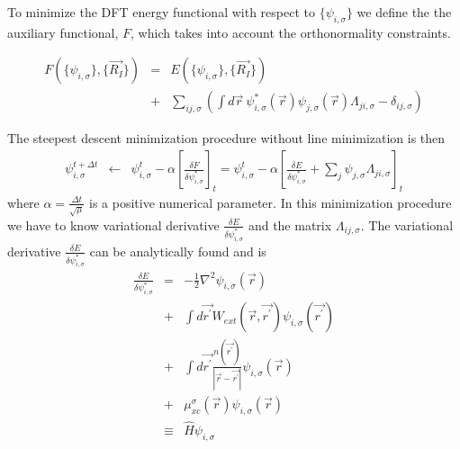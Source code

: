 To minimize the DFT energy functional with respect to $\{\psi_{i,\sigma}\}$
we define the the auxiliary functional, $F$, which takes into account
the orthonormality constraints.

\begin{eqnarray}
F\left(\{\psi_{i,\sigma}\},\{\vec{R_I}\} \right)
&=& E\left(\{\psi_{i,\sigma}\},\{\vec{R_I}\} \right) \nonumber \\
&+&\sum_{ij,\sigma}  \left( \int d\vec{r}\ 
\psi_{i,\sigma}^{*}(\vec{r}) \psi_{j,\sigma}(\vec{r}) \Lambda_{ji,\sigma}
                 - \delta_{ij,\sigma} 
\right) 
\label{eq:sd1}
\end{eqnarray}

\noindent
The steepest descent minimization procedure without line minimization
is then
\begin{eqnarray}
\psi_{i,\sigma}^{t+ \Delta t} 
                   &\leftarrow& 
                    \psi_{i,\sigma}^{t} 
                      - \alpha 
                        \left[ 
                           \frac{\delta F}{\delta \psi_{i,\sigma}^{*}}
                        \right]_{t}
                   = \psi_{i,\sigma}^{t} 
                      - \alpha 
                        \left[ 
                           \frac{\delta E}{\delta \psi_{i,\sigma}^{*}}
                            + \sum_{j} \psi_{j,\sigma} \Lambda_{ji,\sigma} 
                        \right]_{t}
\label{eq:sd2}
\end{eqnarray}
where $\alpha =\frac{\Delta t}{\sqrt{\mu}}$ is a positive numerical parameter.
In this minimization procedure we have to know variational derivative
$\frac{\delta E}{\delta \psi_{i,\sigma}^{*}}$ and the matrix 
$\Lambda_{ij,\sigma}$. 
The variational derivative $\frac{\delta E}{\delta \psi_{i,\sigma}^{*}}$ 
can be analytically found and is
\begin{eqnarray}
\frac{\delta E}{\delta \psi_{i,\sigma}^{*}} 
      &=&  -\frac{1}{2} \nabla^2 
            \psi_{i,\sigma}(\vec{r}) \nonumber \\
      &+& \int d\vec{r^{\prime}} 
           W_{ext}(\vec{r},\vec{r^{\prime}}) 
          \psi_{i,\sigma}(\vec{r^{\prime}}) \nonumber \\
      &+& \int d\vec{r^{\prime}} 
                    \frac{n(\vec{r^{\prime}})}{|\vec{r}-\vec{r^{\prime}}|}
          \psi_{i,\sigma}(\vec{r}) \nonumber \\
      &+& \mu_{xc}^{\sigma}(\vec{r}) 
          \psi_{i,\sigma}(\vec{r}) \nonumber \\
& \equiv & \hat{H} \psi_{i,\sigma}
\label{eq:sd3}
\end{eqnarray}
  
